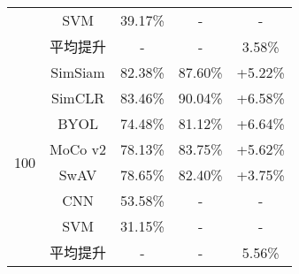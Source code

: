 \documentclass[master]{thesis-uestc}
\begin{document}
\begin{table}[htbp!]
\begin{tabular}{ccccc}
            & SVM     & 39.17\% & -       & -       \\
            & 平均提升 & - & - & 3.58\% \\
        \midrule
        \multirow{8}{*}{100} 
            & SimSiam & 82.38\% & 87.60\% & +5.22\% \\
            & SimCLR  & 83.46\% & 90.04\% & +6.58\% \\
            & BYOL    & 74.48\% & 81.12\% & +6.64\% \\
            & MoCo v2 & 78.13\% & 83.75\% & +5.62\% \\
            & SwAV    & 78.65\% & 82.40\% & +3.75\% \\
            & CNN     & 53.58\% & -       & -       \\
            & SVM     & 31.15\% & -       & -       \\
            & 平均提升 & - & - & 5.56\% \\
        \bottomrule
    \end{tabular}
    \label{tab:longtail_autoaugment_comparison}
\end{table}
\end{document}
